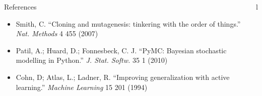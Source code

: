 \documentclass[final]{beamer}
\begin{document}
\begin{frame}{}
\begin{columns}[t]
\begin{column}{.3\linewidth}

\begin{block}{References}


\footnotesize
\begin{itemize}
\item Smith, C. ``Cloning and mutagenesis: tinkering with the order of things.'' \emph{Nat. Methods} 4 455 (2007)
\item Patil, A.; Huard, D.; Fonnesbeck, C. J. ``PyMC: Bayesian stochastic modelling in Python.'' \emph{J. Stat. Softw.} 35 1 (2010)
\item Cohn, D; Atlas, L.; Ladner, R. ``Improving generalization with active learning.'' \emph{Machine Learning} 15 201 (1994)
\end{itemize}
\end{block}

\end{column}l
\end{columns}
\end{frame}
\end{document}

